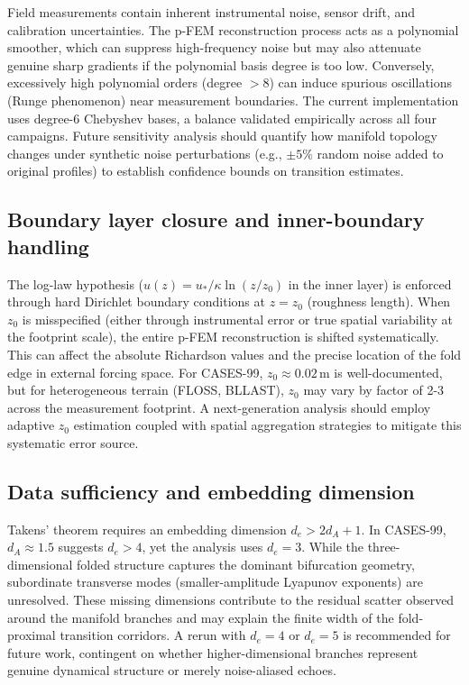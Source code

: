 \documentclass[12pt,a4paper]{article}
\begin{document}
Field measurements contain inherent instrumental noise, sensor drift, and calibration uncertainties. The p-FEM reconstruction process acts as a polynomial smoother, which can suppress high-frequency noise but may also attenuate genuine sharp gradients if the polynomial basis degree is too low. Conversely, excessively high polynomial orders (degree $> 8$) can induce spurious oscillations (Runge phenomenon) near measurement boundaries. The current implementation uses degree-6 Chebyshev bases, a balance validated empirically across all four campaigns. Future sensitivity analysis should quantify how manifold topology changes under synthetic noise perturbations (e.g., $\pm 5\%$ random noise added to original profiles) to establish confidence bounds on transition estimates.

\subsection{Boundary layer closure and inner-boundary handling}

The log-law hypothesis ($u(z) = u_*/\kappa \ln(z/z_0)$ in the inner layer) is enforced through hard Dirichlet boundary conditions at $z = z_0$ (roughness length). When $z_0$ is misspecified (either through instrumental error or true spatial variability at the footprint scale), the entire p-FEM reconstruction is shifted systematically. This can affect the absolute Richardson values and the precise location of the fold edge in external forcing space. For CASES-99, $z_0 \approx 0.02$\,m is well-documented, but for heterogeneous terrain (FLOSS, BLLAST), $z_0$ may vary by factor of 2-3 across the measurement footprint. A next-generation analysis should employ adaptive $z_0$ estimation coupled with spatial aggregation strategies to mitigate this systematic error source.

\subsection{Data sufficiency and embedding dimension}

Takens' theorem requires an embedding dimension $d_e > 2 d_A + 1$. In CASES-99, $d_A \approx 1.5$ suggests $d_e > 4$, yet the analysis uses $d_e = 3$. While the three-dimensional folded structure captures the dominant bifurcation geometry, subordinate transverse modes (smaller-amplitude Lyapunov exponents) are unresolved. These missing dimensions contribute to the residual scatter observed around the manifold branches and may explain the finite width of the fold-proximal transition corridors. A rerun with $d_e = 4$ or $d_e = 5$ is recommended for future work, contingent on whether higher-dimensional branches represent genuine dynamical structure or merely noise-aliased echoes.
\end{document}
